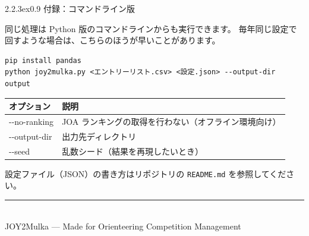\documentclass[a4paper,11pt]{ltjsarticle}
\makeatletter
\renewcommand{\section}{\@startsection{section}{1}{\z@}%
  {2.2\baselineskip \@plus .3ex}{0.9\baselineskip}%
  {\normalfont\Large\bfseries\color{brandink}}}
\newcommand{\fn}[1]{\texttt{#1}}
\makeatother
\begin{document}
\section{付録：コマンドライン版}

同じ処理は Python 版のコマンドラインからも実行できます。
毎年同じ設定で回すような場合は、こちらのほうが早いことがあります。

\begin{verbatim}
pip install pandas
python joy2mulka.py <エントリーリスト.csv> <設定.json> --output-dir output
\end{verbatim}

\begin{center}
\begin{tabular}{@{}>{\ttfamily}p{34mm}p{112mm}@{}}
\toprule
\rowcolor{band}\textbf{\rmfamily オプション} & \textbf{説明} \\
\midrule
-{}-no-ranking & JOA ランキングの取得を行わない（オフライン環境向け） \\
-{}-output-dir & 出力先ディレクトリ \\
-{}-seed & 乱数シード（結果を再現したいとき） \\
\bottomrule
\end{tabular}
\end{center}

設定ファイル（JSON）の書き方はリポジトリの \fn{README.md} を参照してください。

\vspace{12mm}
\begin{center}
\color{grayrule}\rule{0.4\textwidth}{0.4pt}\\[6pt]
{\small\color{brandink}JOY2Mulka — Made for Orienteering Competition Management}
\end{center}
\end{document}
